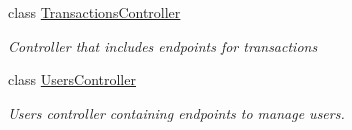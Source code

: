 \begin{DoxyCompactItemize}
class \mbox{\hyperlink{class_gielda_l2_1_1_a_p_i_1_1_controllers_1_1_transactions_controller}{Transactions\+Controller}}
\begin{DoxyCompactList}\small\item\em Controller that includes endpoints for transactions \end{DoxyCompactList}\item 
class \mbox{\hyperlink{class_gielda_l2_1_1_a_p_i_1_1_controllers_1_1_users_controller}{Users\+Controller}}
\begin{DoxyCompactList}\small\item\em Users controller containing endpoints to manage users. \end{DoxyCompactList}\end{DoxyCompactItemize}

